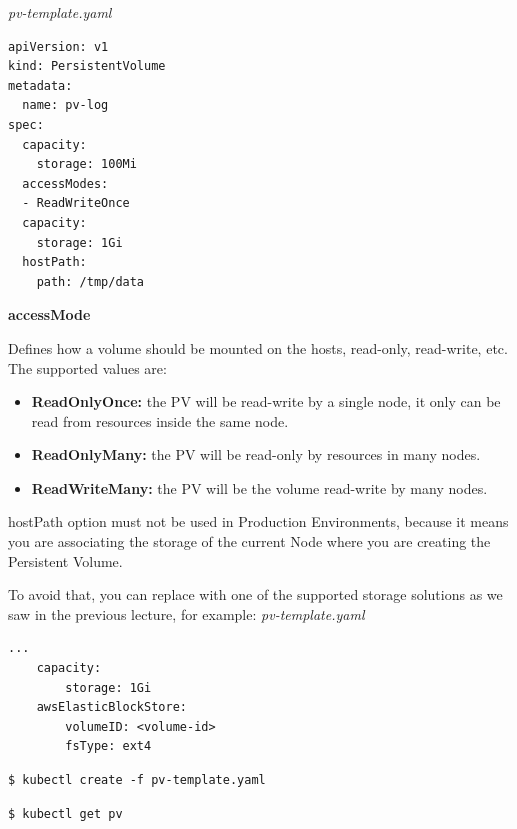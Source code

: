 \documentclass{article}
\newenvironment{blocktemplateIII}[1]{%
    \tcolorbox[beamer,%
    noparskip,breakable,
    ,colframe=Red,%
    colbacklower=LimeGreen!75!LightGreen,%
    title=#1]}%
    {\endtcolorbox}
\newenvironment{codetemplate}[1][]{%
  \mybasecolorbox[#1]
  \itshape
}{%
  \endmybasecolorbox
}
\begin{document}
\begin{codetemplate}{pv-template.yaml}
\begin{verbatim}
apiVersion: v1
kind: PersistentVolume
metadata:
  name: pv-log
spec:
  capacity:
    storage: 100Mi
  accessModes:
  - ReadWriteOnce
  capacity:
    storage: 1Gi
  hostPath:
    path: /tmp/data
\end{verbatim}
\end{codetemplate}

\textbf{accessMode}

Defines how a volume should be mounted on the hosts, read-only, read-write, etc. The supported values are:
\begin{itemize}
    \item \textbf{ReadOnlyOnce:} the PV will be read-write by a single node, it only can be read from resources inside the same node.
    \item \textbf{ReadOnlyMany:} the PV will be read-only by resources in many nodes.
    \item \textbf{ReadWriteMany:} the PV will be the volume read-write by many nodes.
\end{itemize}

\begin{blocktemplateIII}{WARNING}
hostPath option must not be used in Production Environments, because it means you are associating the storage of the current Node where you are creating the Persistent Volume.

To avoid that, you can replace with one of the supported storage solutions as we saw in the previous lecture, for example:
\begin{codetemplate}{pv-template.yaml}
\begin{verbatim}
...
    capacity:
        storage: 1Gi
    awsElasticBlockStore:
        volumeID: <volume-id>
        fsType: ext4
\end{verbatim}
\end{codetemplate}

\end{blocktemplateIII}

\begin{codetemplate}{}
\begin{verbatim}
$ kubectl create -f pv-template.yaml
\end{verbatim}
\end{codetemplate}

\begin{codetemplate}{}
\begin{verbatim}
$ kubectl get pv
\end{verbatim}
\end{codetemplate}
\end{document}
